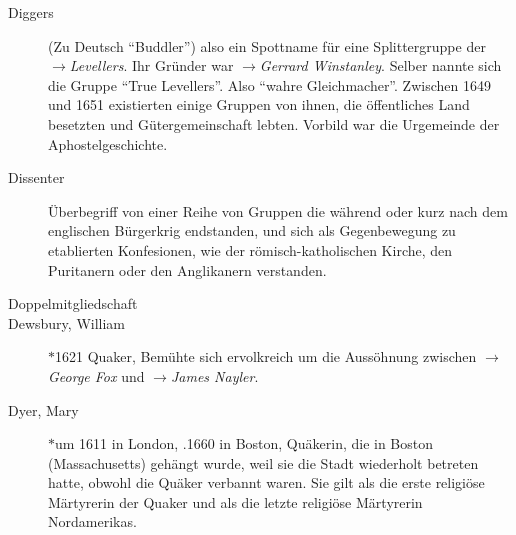\begin{description}
\item[Diggers] (Zu Deutsch "`Buddler"') also ein Spottname für eine Splittergruppe der $\to$\textit{Levellers}. Ihr Gründer war $\to$\textit{Gerrard Winstanley}. Selber nannte sich die Gruppe "`True Levellers"'. Also "`wahre Gleichmacher"'. Zwischen 1649 und 1651 existierten  einige Gruppen von ihnen, die öffentliches Land besetzten und Gütergemeinschaft lebten. Vorbild war die Urgemeinde der Aphostelgeschichte.

\item[Dissenter] Überbegriff von einer Reihe von Gruppen die während oder kurz nach dem englischen Bürgerkrig endstanden, und sich als Gegenbewegung zu etablierten Konfesionen, wie der römisch-katholischen Kirche, den Puritanern oder den Anglikanern verstanden.

 \item[Doppelmitgliedschaft]

 \item[Dewsbury, William] $\ast$1621  Quaker, Bemühte sich ervolkreich um die Aussöhnung zwischen $\to$\textit{George Fox} und $\to$\textit{James Nayler}.

 \item[Dyer, Mary] $\ast$um 1611 in London, .1660 in Boston, Quäkerin, die in Boston (Massachusetts) gehängt wurde, weil sie die Stadt wiederholt betreten hatte, obwohl die Quäker verbannt waren. Sie gilt als die erste religiöse Märtyrerin der Quaker und als die letzte religiöse Märtyrerin Nordamerikas.

 \end{description}

\normalsize
